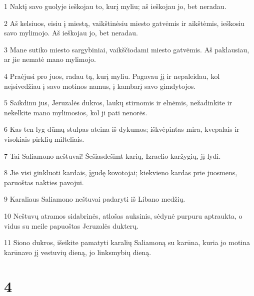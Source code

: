 \par 1 Naktį savo guolyje ieškojau to, kurį myliu; aš ieškojau jo, bet neradau. 
\par 2 Aš kelsiuos, eisiu į miestą, vaikštinėsiu miesto gatvėmis ir aikštėmis, ieškosiu savo mylimojo. Aš ieškojau jo, bet neradau. 
\par 3 Mane sutiko miesto sargybiniai, vaikščiodami miesto gatvėmis. Aš paklausiau, ar jie nematė mano mylimojo. 
\par 4 Praėjusi pro juos, radau tą, kurį myliu. Pagavau jį ir nepaleidau, kol neįsivedžiau į savo motinos namus, į kambarį savo gimdytojos. 
\par 5 Saikdinu jus, Jeruzalės dukros, laukų stirnomis ir elnėmis, nežadinkite ir nekelkite mano mylimosios, kol ji pati nenorės. 
\par 6 Kas ten lyg dūmų stulpas ateina iš dykumos; iškvėpintas mira, kvepalais ir visokiais pirklių milteliais. 
\par 7 Tai Saliamono neštuvai! Šešiasdešimt karių, Izraelio karžygių, jį lydi. 
\par 8 Jie visi ginkluoti kardais, įgudę kovotojai; kiekvieno kardas prie juosmens, paruoštas nakties pavojui. 
\par 9 Karaliaus Saliamono neštuvai padaryti iš Libano medžių. 
\par 10 Neštuvų atramos sidabrinės, atlošas auksinis, sėdynė purpuru aptraukta, o vidus su meile papuoštas Jeruzalės dukterų. 
\par 11 Siono dukros, išeikite pamatyti karalių Saliamoną su karūna, kuria jo motina karūnavo jį vestuvių dieną, jo linksmybių dieną.



\chapter{4}


